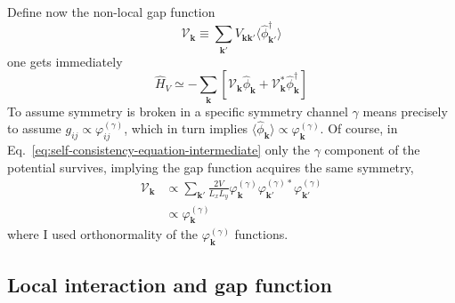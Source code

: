 Define now the non-local gap function
\begin{equation}\label{eq:self-consistency-equation-intermediate}
	\mathcal{V}_\mathbf{k} \equiv \sum_{\mathbf{k}'}
	V_{\mathbf{k}\mathbf{k}'}
	\langle
	\hat \phi_{\mathbf{k}'}^\dagger
	\rangle
\end{equation}
one gets immediately
\begin{equation}\label{eq:extended-hubbard-nonlocal-interaction-mean-field-reciprocal}
	\hat H_V \simeq -\sum_\mathbf{k} \left[
	\mathcal{V}_\mathbf{k} \hat \phi_\mathbf{k} + \mathcal{V}_\mathbf{k}^* \hat \phi_\mathbf{k}^\dagger
	\right]	
\end{equation}
To assume symmetry is broken in a specific symmetry channel $\gamma$ means precisely to assume $g_{ij} \propto \varphi_{ij}^{(\gamma)}$, which in turn implies $\langle \hat \phi_\mathbf{k} \rangle \propto \varphi_\mathbf{k}^{(\gamma)}$. Of course, in Eq.~\eqref{eq:self-consistency-equation-intermediate} only the $\gamma$ component of the potential survives, implying the gap function acquires the same symmetry,
\[
\begin{aligned}
	\mathcal{V}_\mathbf{k} &\propto \sum_{\mathbf{k}'}
	\frac{2V}{L_xL_y} \varphi_\mathbf{k}^{(\gamma)} \varphi_{\mathbf{k}'}^{(\gamma)*}
	\varphi_{\mathbf{k}'}^{(\gamma)} \\
	&\propto \varphi_\mathbf{k}^{(\gamma)}
\end{aligned}
\]
where I used orthonormality of the $\varphi_\mathbf{k}^{(\gamma)}$ functions.

\subsection{Local interaction and gap function}

